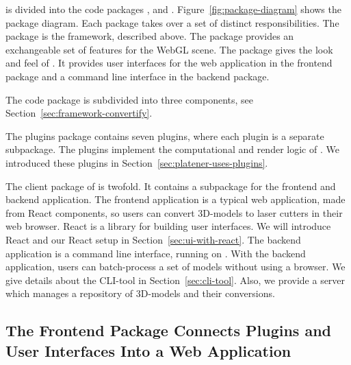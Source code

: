 \documentclass[../../ClassicThesis.tex]{subfiles}
\begin{document}
{\platener} is divided into the code packages {\convertify},
 and . Figure~\ref{fig:package-diagram}
shows the package diagram. Each package takes over a set of distinct
responsibilities. The {\convertify} package is the framework,
described above. The  package provides an exchangeable
set of features for the WebGL scene. The  package gives
the look and feel of {\platener}. It provides user interfaces for the
web application in the frontend package and a command line interface
in the backend package.

The {\convertify} code package is subdivided into three components,
see Section~\ref{sec:framework-convertify}.

The plugins package contains seven plugins, where each plugin is a
separate subpackage. The plugins implement the computational and
render logic of {\platener}. We introduced these plugins in
Section~\ref{sec:platener-uses-plugins}.


The client package of {\platener} is twofold. It contains a subpackage
for the frontend and backend application.  The frontend application is a
typical web application, made from React components, so users can
convert 3D-models to laser cutters in their web browser. React is a
{\javascript} library for building user interfaces. We will introduce
React and our React setup in Section~\ref{sec:ui-with-react}. The
backend application is a command line interface, running on {\nodejs}.
With the backend application, users can batch-process a set of models
without using a browser. We give details about the CLI-tool in
Section~\ref{sec:cli-tool}. Also, we provide a server which manages a
repository of 3D-models and their conversions.

\subsection{The Frontend Package Connects Plugins and User Interfaces
  Into a Web Application}
\label{sec:client-to-application}



\end{document}
